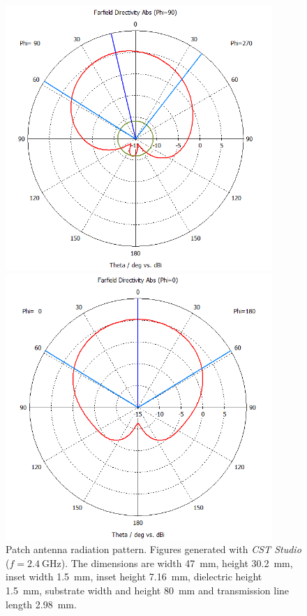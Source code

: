 \begin{figure}[H]
    \begin{minipage}{0.45\textwidth}
        \centering
        \includegraphics[width=0.9\textwidth]{figures/farfield (f=2.4) patch.png} %
    \end{minipage}\hfill
    \begin{minipage}{0.45\textwidth}
        \centering
        \includegraphics[width=0.9\textwidth]{figures/farfield (f=2.4) patch_1.png} %
    \end{minipage}
    \caption{Patch antenna radiation pattern. Figures generated with \textit{CST Studio} ($f=\SI{2.4}{\giga\hertz}$). The dimensions are width \SI{47}{\milli\meter}, height \SI{30.2}{\milli\meter}, inset width \SI{1.5}{\milli\meter}, inset height \SI{7.16}{\milli\meter}, dielectric height \SI{1.5}{\milli\meter}, substrate width and height \SI{80}{\milli\meter} and transmission line length \SI{2.98}{\milli\meter}.}
    \label{fig:patch_1}
\end{figure}

